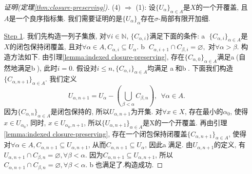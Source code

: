 \begin{proof}[证明(定理\ref{thm:closure-preserving})]
  (4) $\Rightarrow$ (1): 设$\{ U_{\alpha} \}_{\alpha \in A}$是$X$的一个开覆盖, 且$A$是一个良序指标集.
  我们需要证明的是$\{ U_{\alpha} \}_{\alpha}$存在$\sigma$-局部有限开加细.
  
  \underline{Step 1}.
  我们先构造一列子集族, 对$\forall i \in \mathbb{N}$,
  $\{ C_{\alpha, i} \}$满足下面的条件: \newline
  \textcircled{a}
    $\{ C_{\alpha, i} \}_{\alpha \in A}$是$X$的闭包保持闭覆盖,
    且对$\forall \alpha \in A, C_{\alpha, i} \subseteq U_{\alpha}$.\newline
  \textcircled{b}
    $C_{\alpha, i+1} \cap C_{\beta, i} = \varnothing,$ 对$\forall \alpha > \beta$.\newline
  构造方法如下. 由引理\ref{lemma:indexed closure-preserving},
  存在$\{ C_{\alpha, 0} \}_{\alpha \in A}$满足\textcircled{a}(自然地满足\textcircled{b}),
  此时$i = 0$. 假设对$i \leq n, \{ C_{\alpha, i} \}_{\alpha \in A}$均满足
  \textcircled{a}和\textcircled{b}. 下面我们构造$\{ C_{\alpha, n+1} \}_{\alpha \in A}$.
  我们定义
  \[
    U_{\alpha, n+1} = U_\alpha - ( \bigcup_{\beta < \alpha} C_{\beta, n} ),\,\,\,\forall \alpha \in A.
  \]
  因为$\{ C_{\alpha, n} \}_{\alpha \in A}$是闭包保持的, 所以$U_{\alpha, n+1}$为开集.
  对$\forall x \in X$, 存在最小的$\alpha_0$, 使得$x \in U_{\alpha_0}$,
  同时, $x \in U_{\alpha_0, n+1}$, 所以$\{ U_{\alpha, n+1} \}_{\alpha \in A}$是X的一个开覆盖.
  再由引理\ref{lemma:indexed closure-preserving},
  存在一个闭包保持闭覆盖$\{ C_{\alpha, n+1} \}_{\alpha \in A}$,
  使得对$\forall \alpha \in A, C_{\alpha, n+1} \subseteq U_{\alpha, n+1}$,
  从而$C_{\alpha, n+1} \subseteq U_{\alpha}$, 因此\textcircled{a}满足.
  由$U_{\alpha, n+1}$的定义,
  有$U_{\alpha, n+1} \cap C_{\beta, n} = \varnothing, \forall \beta < \alpha$.
  因为$C_{\alpha, n+1} \subseteq U_{\alpha, n+1}$, 
  所以$C_{\alpha, n+1} \cap C_{\beta, n} = \varnothing, \forall \beta < \alpha$.
  \textcircled{b}也满足了.构造成功.


\end{proof}
